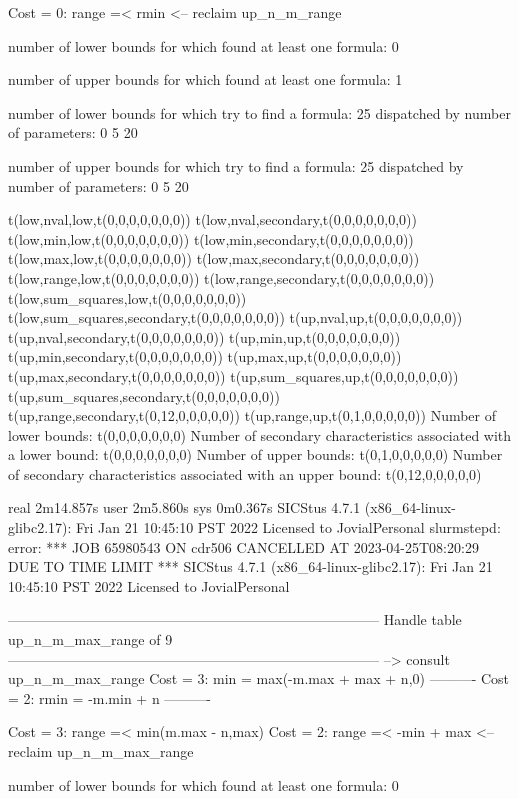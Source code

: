 Cost =  0:  range =< rmin
<-- reclaim up_n_m_range

number of lower bounds for which found at least one formula: 0

number of upper bounds for which found at least one formula: 1

number of lower bounds for which try to find a formula: 25
dispatched by number of parameters: 0  5  20

number of upper bounds for which try to find a formula: 25
dispatched by number of parameters: 0  5  20

t(low,nval,low,t(0,0,0,0,0,0,0))
t(low,nval,secondary,t(0,0,0,0,0,0,0))
t(low,min,low,t(0,0,0,0,0,0,0))
t(low,min,secondary,t(0,0,0,0,0,0,0))
t(low,max,low,t(0,0,0,0,0,0,0))
t(low,max,secondary,t(0,0,0,0,0,0,0))
t(low,range,low,t(0,0,0,0,0,0,0))
t(low,range,secondary,t(0,0,0,0,0,0,0))
t(low,sum_squares,low,t(0,0,0,0,0,0,0))
t(low,sum_squares,secondary,t(0,0,0,0,0,0,0))
t(up,nval,up,t(0,0,0,0,0,0,0))
t(up,nval,secondary,t(0,0,0,0,0,0,0))
t(up,min,up,t(0,0,0,0,0,0,0))
t(up,min,secondary,t(0,0,0,0,0,0,0))
t(up,max,up,t(0,0,0,0,0,0,0))
t(up,max,secondary,t(0,0,0,0,0,0,0))
t(up,sum_squares,up,t(0,0,0,0,0,0,0))
t(up,sum_squares,secondary,t(0,0,0,0,0,0,0))
t(up,range,secondary,t(0,12,0,0,0,0,0))
t(up,range,up,t(0,1,0,0,0,0,0))
Number of lower bounds:                                             t(0,0,0,0,0,0,0)
Number of secondary characteristics associated with a lower bound:  t(0,0,0,0,0,0,0)
Number of upper bounds:                                             t(0,1,0,0,0,0,0)
Number of secondary characteristics associated with an upper bound: t(0,12,0,0,0,0,0)

real	2m14.857s
user	2m5.860s
sys	0m0.367s
SICStus 4.7.1 (x86_64-linux-glibc2.17): Fri Jan 21 10:45:10 PST 2022
Licensed to JovialPersonal
slurmstepd: error: *** JOB 65980543 ON cdr506 CANCELLED AT 2023-04-25T08:20:29 DUE TO TIME LIMIT ***
SICStus 4.7.1 (x86_64-linux-glibc2.17): Fri Jan 21 10:45:10 PST 2022
Licensed to JovialPersonal


--------------------------------------------------------------------------------
Handle table up_n_m_max_range of 9
--------------------------------------------------------------------------------
--> consult up_n_m_max_range
Cost =  3:  min  = max(-m.max + max + n,0)
----------
Cost =  2:  rmin = -m.min + n
----------

Cost =  3:  range =< min(m.max - n,max)
Cost =  2:  range =< -min + max
<-- reclaim up_n_m_max_range

number of lower bounds for which found at least one formula: 0

